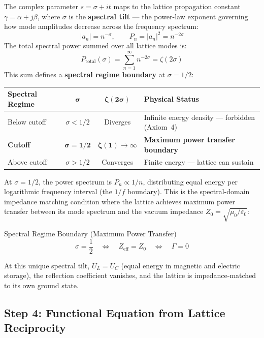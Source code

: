 The complex parameter $s = \sigma + it$ maps to the lattice propagation constant $\gamma = \alpha + j\beta$, where $\sigma$ is the \textbf{spectral tilt} --- the power-law exponent governing how mode amplitudes decrease across the frequency spectrum:
\begin{equation}
    |a_n| = n^{-\sigma}, \qquad P_n = |a_n|^2 = n^{-2\sigma}
\end{equation}
The total spectral power summed over all lattice modes is:
\begin{equation}
    P_\mathrm{total}(\sigma) = \sum_{n=1}^{\infty} n^{-2\sigma} = \zeta(2\sigma)
\end{equation}
This sum defines a \textbf{spectral regime boundary} at $\sigma = 1/2$:
\begin{center}
\small
\begin{tabularx}{\textwidth}{@{}l c c X@{}}
\toprule
\textbf{Spectral Regime} & $\boldsymbol{\sigma}$ & $\boldsymbol{\zeta(2\sigma)}$ & \textbf{Physical Status} \\
\midrule
Below cutoff & $\sigma < 1/2$ & Diverges & Infinite energy density --- forbidden (Axiom~4) \\
\textbf{Cutoff} & $\boldsymbol{\sigma = 1/2}$ & $\boldsymbol{\zeta(1) \to \infty}$ & \textbf{Maximum power transfer boundary} \\
Above cutoff & $\sigma > 1/2$ & Converges & Finite energy --- lattice can sustain \\
\bottomrule
\end{tabularx}
\end{center}
At $\sigma = 1/2$, the power spectrum is $P_n \propto 1/n$, distributing equal energy per logarithmic frequency interval (the $1/f$ boundary). This is the spectral-domain impedance matching condition where the lattice achieves maximum power transfer between its mode spectrum and the vacuum impedance $Z_0 = \sqrt{\mu_0/\varepsilon_0}$:
\begin{resultbox}{Spectral Regime Boundary (Maximum Power Transfer)}
\begin{equation}
    \sigma = \frac{1}{2} \quad\Longleftrightarrow\quad Z_\mathrm{eff} = Z_0 \quad\Longleftrightarrow\quad \Gamma = 0
\end{equation}
\end{resultbox}
At this unique spectral tilt, $U_L = U_C$ (equal energy in magnetic and electric storage), the reflection coefficient vanishes, and the lattice is impedance-matched to its own ground state.

\subsection{Step 4: Functional Equation from Lattice Reciprocity}

